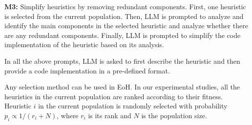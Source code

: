 \textbf{M3:} Simplify heuristics by removing redundant components. First, one heuristic is selected from the current population. Then, LLM is prompted to analyze and identify the main components in the selected heuristic and analyze whether there are any redundant components.
Finally, LLM is prompted to simplify the code implementation of the heuristic based on its analysis.

In all the above prompts, LLM is asked to first describe the heuristic and then provide a code implementation in a pre-defined format.

Any selection method can be used in EoH. In our experimental studies, all the heuristics in the current population are ranked according to their 
fitness.  Heuristic $i$ in the current population is randomly selected with probability $p_i \propto 1/(r_i+N)$, where $r_i$ is its rank and $N$ is the population size. 

\vspace{1pt}
